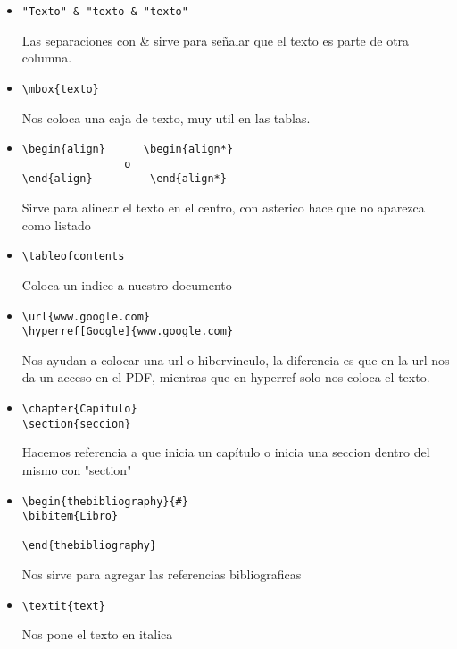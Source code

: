 \documentclass{book}
\begin{document}
\begin{itemize}
		\begin{lstlisting}  
\hline  o \hline "texto" \hline
		\end{lstlisting}  Dibuja lineas horizontales a nuestra tabla, si se coloca el texto entre dos de esta lineas se cierra la tabla
		\item 
		\begin{lstlisting}  
"Texto" & "texto & "texto"
		\end{lstlisting} Las separaciones con \& sirve para señalar que el texto es parte de otra columna.
		\item
		\begin{lstlisting}  
\mbox{texto}
		\end{lstlisting} Nos coloca una caja de texto, muy util en las tablas.
		\item
		\begin{lstlisting} 
\begin{align}      \begin{align*}
        		o     
\end{align}         \end{align*}
		\end{lstlisting} Sirve para alinear el texto en el centro, con asterico hace que no aparezca como listado
		\item
		\begin{lstlisting}  
\tableofcontents
		\end{lstlisting} Coloca un indice a nuestro documento
		\item
		\begin{lstlisting} 
\url{www.google.com}
\hyperref[Google]{www.google.com}			
		\end{lstlisting} Nos ayudan a colocar una url o hibervinculo, la diferencia es que en la url nos da un acceso en el PDF, mientras que en hyperref solo nos coloca el texto.
		\item
		\begin{lstlisting} 
\chapter{Capitulo}
\section{seccion}		
		\end{lstlisting} Hacemos referencia a que inicia un capítulo o  inicia una seccion dentro del mismo con "section"
		\item
		\begin{lstlisting} 
\begin{thebibliography}{#}
\bibitem{Libro}
		
\end{thebibliography}		
		\end{lstlisting} Nos sirve para agregar las referencias bibliograficas
		\item
		\begin{lstlisting} 
\textit{text}		
		\end{lstlisting} Nos pone el texto en italica
		
		
		
	\end{itemize}
	
\end{document}
